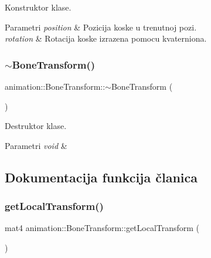 Konstruktor klase. 


\begin{DoxyParams}{Parametri}
{\em position} & Pozicija koske u trenutnoj pozi. \\
\hline
{\em rotation} & Rotacija koske izrazena pomocu kvaterniona. \\
\hline
\end{DoxyParams}
\mbox{\label{classanimation_1_1BoneTransform_a269100a100f34b2116bd5aacd1821c12}} 
\subsubsection{\texorpdfstring{$\sim$\+Bone\+Transform()}{~BoneTransform()}}
{\footnotesize\ttfamily animation\+::\+Bone\+Transform\+::$\sim$\+Bone\+Transform (\begin{DoxyParamCaption}{ }\end{DoxyParamCaption})}



Destruktor klase. 


\begin{DoxyParams}{Parametri}
{\em void} & \\
\hline
\end{DoxyParams}


\subsection{Dokumentacija funkcija članica}
\mbox{\label{classanimation_1_1BoneTransform_a6a79147d90aecac6c5481927be659ca7}} 
\subsubsection{\texorpdfstring{get\+Local\+Transform()}{getLocalTransform()}}
{\footnotesize\ttfamily mat4 animation\+::\+Bone\+Transform\+::get\+Local\+Transform (\begin{DoxyParamCaption}{ }\end{DoxyParamCaption})}



